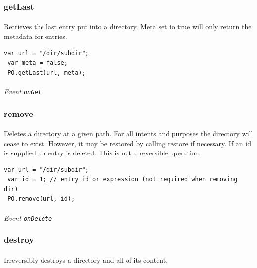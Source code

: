 \documentclass{report}
\begin{document}
\subsubsection{getLast}
\paragraph{}
Retrieves the last entry put into a directory. 
Meta set to true will only return the metadata for entries.

\begin{Verbatim}[frame=single]
 var url = "/dir/subdir";
 var meta = false;
 PO.getLast(url, meta);
\end{Verbatim}

\paragraph{}
\textit{Event \texttt{onGet}}

\subsubsection{remove}
\paragraph{}
Deletes a directory at a given path. For all intents and purposes 
the directory will cease to exist. However, it may be restored by 
calling restore if necessary. If an id is supplied an entry
is deleted. This is not a reversible operation.

\begin{Verbatim}[frame=single]
 var url = "/dir/subdir";
 var id = 1; // entry id or expression (not required when removing dir)
 PO.remove(url, id);
\end{Verbatim}

\paragraph{}
\textit{Event \texttt{onDelete}}

\subsubsection{destroy}
\paragraph{}
Irreversibly destroys a directory and all of its content.
\end{document}

